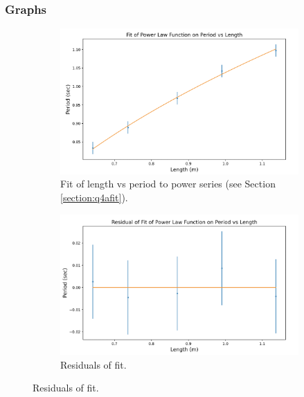 \documentclass[12pt]{article}
\begin{document}
\subsubsection{Graphs}
\begin{figure}[h]
    \centering
    \begin{subfigure}[b]{0.48\textwidth}
        \centering
        \includegraphics[width=\textwidth]{q4a_fit.png}
        \caption{Fit of length vs period to power series (see Section \ref{section:q4afit}).}
        \label{fig:q4afit}
    \end{subfigure}
    \hfill
    \begin{subfigure}[b]{0.48\textwidth}
        \centering
        \includegraphics[width=\textwidth]{q4a_residuals.png}
        \caption{Residuals of fit.}
        \label{fig:q4aresiduals}
    \end{subfigure}
    \label{fig:q4afig}
\end{figure}
\end{document}
